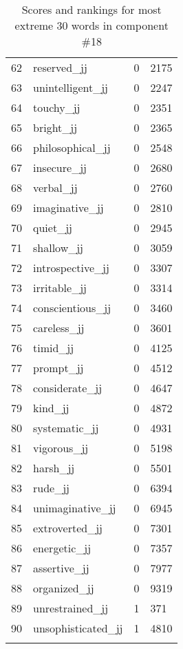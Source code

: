 \begin{longtable}[!htbp]{| rlr@{.}l |}
    62 & reserved\_jj & 0 & 2175 \\
    63 & unintelligent\_jj & 0 & 2247 \\
    64 & touchy\_jj & 0 & 2351 \\
    65 & bright\_jj & 0 & 2365 \\
    66 & philosophical\_jj & 0 & 2548 \\
    67 & insecure\_jj & 0 & 2680 \\
    68 & verbal\_jj & 0 & 2760 \\
    69 & imaginative\_jj & 0 & 2810 \\
    70 & quiet\_jj & 0 & 2945 \\
    71 & shallow\_jj & 0 & 3059 \\
    72 & introspective\_jj & 0 & 3307 \\
    73 & irritable\_jj & 0 & 3314 \\
    74 & conscientious\_jj & 0 & 3460 \\
    75 & careless\_jj & 0 & 3601 \\
    76 & timid\_jj & 0 & 4125 \\
    77 & prompt\_jj & 0 & 4512 \\
    78 & considerate\_jj & 0 & 4647 \\
    79 & kind\_jj & 0 & 4872 \\
    80 & systematic\_jj & 0 & 4931 \\
    81 & vigorous\_jj & 0 & 5198 \\
    82 & harsh\_jj & 0 & 5501 \\
    83 & rude\_jj & 0 & 6394 \\
    84 & unimaginative\_jj & 0 & 6945 \\
    85 & extroverted\_jj & 0 & 7301 \\
    86 & energetic\_jj & 0 & 7357 \\
    87 & assertive\_jj & 0 & 7977 \\
    88 & organized\_jj & 0 & 9319 \\
    89 & unrestrained\_jj & 1 & 371 \\
    90 & unsophisticated\_jj & 1 & 4810 \\
    \hline
    \caption{Scores and rankings for most extreme 30 words in component \#18} \\
\end{longtable}
